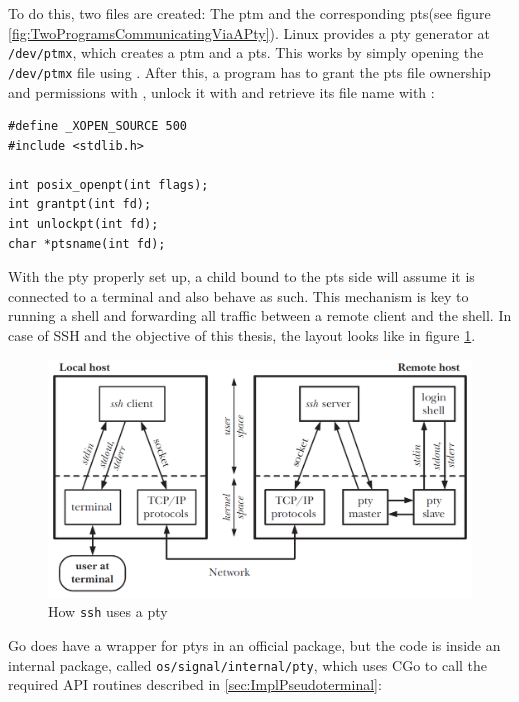 \documentclass[10pt,a4paper,titlepage,twoside,english,final]{zhawreprt}
\begin{document}
To do this, two files are created:
The \gls{ptm} and the corresponding \gls{pts}(see figure \ref{fig:TwoProgramsCommunicatingViaAPty}).
\gls{Linux} provides a \gls{pty} generator at \texttt{/dev/ptmx}, which creates a \gls{ptm} and a \gls{pts}.
This works by simply opening the \texttt{/dev/ptmx} file using \cite{posix_openpt}.
After this, a program has to grant the \gls{pts} file ownership and permissions with \cite{grantpt}, unlock it with \cite{unlockpt} and retrieve its file name with \cite{ptsname}:

\setlistingC
\begin{lstlisting}[caption={\gls{pty} related \gls{Linux} \gls{API} functions},label=lst:PtyFunctions]
#define _XOPEN_SOURCE 500
#include <stdlib.h>

int posix_openpt(int flags);
int grantpt(int fd);
int unlockpt(int fd);
char *ptsname(int fd);
\end{lstlisting}

With the \gls{pty} properly set up, a child bound to the \gls{pts} side will assume it is connected to a \gls{terminal} and also behave as such.
This mechanism is key to running a \gls{shell} and forwarding all traffic between a remote client and the \gls{shell}.
In case of \gls{SSH} and the objective of this thesis, the layout looks like in figure \ref{fig:HowSSHUsesPty}.

\begin{figure}[ht]
\includegraphics[width=\textwidth]{PseudoterminalSSH}
\caption{How \texttt{ssh} uses a \gls{pty} \citep[p.1378]{KerriskTLPI}}
\label{fig:HowSSHUsesPty}
\end{figure}

\gls{Go} does have a wrapper for \glspl{pty} in an official package, but the code is inside an internal package, called \texttt{os/signal/internal/pty}, which uses \gls{CGo} to call the required \gls{API} routines described in \ref{sec:ImplPseudoterminal}:
\end{document}
